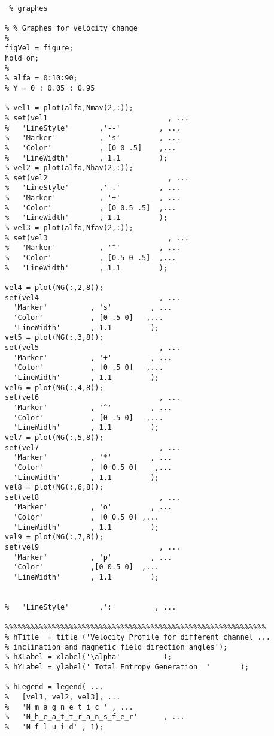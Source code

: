  \begin{lstlisting}
 
 % graphes

% % Graphes for velocity change
% 
figVel = figure;
hold on;
% 
% alfa = 0:10:90;
% Y = 0 : 0.05 : 0.95

% vel1 = plot(alfa,Nmav(2,:));
% set(vel1                            , ...
%   'LineStyle'       ,'--'         , ...  
%   'Marker'          , 's'         , ...
%   'Color'           , [0 0 .5]    ,...
%   'LineWidth'       , 1.1         );
% vel2 = plot(alfa,Nhav(2,:));
% set(vel2                            , ...
%   'LineStyle'       ,'-.'         , ...
%   'Marker'          , '+'         , ...
%   'Color'           , [0 0.5 .5]  ,...
%   'LineWidth'       , 1.1         );
% vel3 = plot(alfa,Nfav(2,:));
% set(vel3                            , ...
%   'Marker'          , '^'         , ...
%   'Color'           , [0.5 0 .5]  ,...
%   'LineWidth'       , 1.1         );

vel4 = plot(NG(:,2,8));
set(vel4                            , ...
  'Marker'          , 's'         , ...
  'Color'           , [0 .5 0]   ,...
  'LineWidth'       , 1.1         );
vel5 = plot(NG(:,3,8));
set(vel5                            , ...
  'Marker'          , '+'         , ...
  'Color'           , [0 .5 0]   ,...
  'LineWidth'       , 1.1         );
vel6 = plot(NG(:,4,8));
set(vel6                            , ...
  'Marker'          , '^'         , ...
  'Color'           , [0 .5 0]   ,...
  'LineWidth'       , 1.1         );
vel7 = plot(NG(:,5,8));
set(vel7                            , ...
  'Marker'          , '*'         , ...
  'Color'           , [0 0.5 0]    ,...
  'LineWidth'       , 1.1         );
vel8 = plot(NG(:,6,8));
set(vel8                            , ...
  'Marker'          , 'o'         , ...
  'Color'           , [0 0.5 0] ,...
  'LineWidth'       , 1.1         );
vel9 = plot(NG(:,7,8));
set(vel9                            , ...
  'Marker'          , 'p'         , ...
  'Color'           ,[0 0.5 0]  ,...
  'LineWidth'       , 1.1         );


%   'LineStyle'       ,':'         , ...

%%%%%%%%%%%%%%%%%%%%%%%%%%%%%%%%%%%%%%%%%%%%%%%%%%%%%%%%%%%%%
% hTitle  = title ('Velocity Profile for different channel ...
% inclination and magnetic field direction angles');
% hXLabel = xlabel('\alpha'          );  
% hYLabel = ylabel(' Total Entropy Generation  '       );

% hLegend = legend( ...
%   [vel1, vel2, vel3], ...
%   'N_m_a_g_n_e_t_i_c ' , ...
%   'N_h_e_a_t_t_r_a_n_s_f_e_r'      , ...
%   'N_f_l_u_i_d' , 1);



\end{lstlisting}
